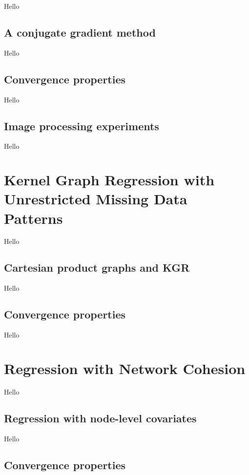 Hello

\subsection{A conjugate gradient method}

Hello

\subsection{Convergence properties}

Hello

\subsection{Image processing experiments}

Hello



\section{Kernel Graph Regression with Unrestricted Missing Data Patterns}

\label{sec:kgr_mdp}

Hello

\subsection{Cartesian product graphs and KGR}

Hello

\subsection{Convergence properties}

Hello


\section{Regression with Network Cohesion}

\label{sec:rnc_mdp}

Hello

\subsection{Regression with node-level covariates}

Hello

\subsection{Convergence properties}


